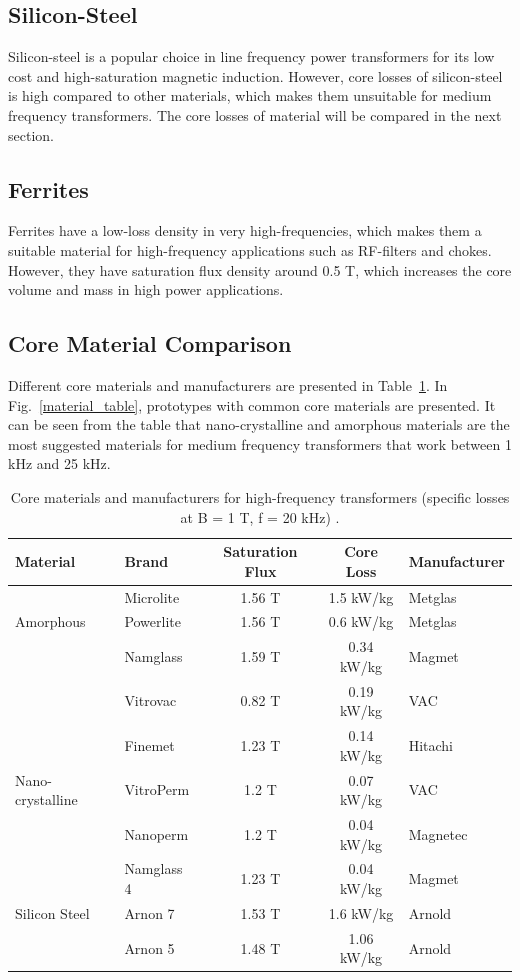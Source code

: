 \documentclass[a4paper, 11pt]{article} %
\begin{document}
\subsection*{Silicon-Steel}

Silicon-steel is a popular choice in line frequency power transformers for its low cost and high-saturation magnetic induction. However, core losses of silicon-steel is high compared to other materials, which makes them unsuitable for medium frequency transformers. The core losses of material will be compared in the next section.

\subsection*{Ferrites}

Ferrites have a low-loss density in very high-frequencies, which makes them a suitable material for high-frequency applications such as RF-filters and chokes. However, they have saturation flux density around 0.5 T, which increases the core volume and mass in high power applications. 

\subsection*{Core Material Comparison}

Different core materials and manufacturers are presented in Table~\ref{core-loss-table}. In Fig.~\ref{material_table}, prototypes with common core materials are presented. It can be seen from the table that nano-crystalline and amorphous materials are the most suggested materials for medium frequency transformers that work between 1 kHz and 25 kHz.

\begin{table}[]
\begin{center}
\begin{tabular}{llccl}
 Material & Brand & Saturation Flux & Core Loss & Manufacturer \\ 
 \hline
& Microlite & 1.56 T & 1.5 kW/kg & Metglas\\
Amorphous & Powerlite & 1.56 T & 0.6 kW/kg & Metglas\\
& Namglass & 1.59 T & 0.34 kW/kg & Magmet\\
& Vitrovac & 0.82 T & 0.19 kW/kg & VAC\\
\hline
& Finemet & 1.23 T & 0.14 kW/kg & Hitachi\\
Nano-crystalline& VitroPerm & 1.2 T & 0.07 kW/kg & VAC\\
& Nanoperm & 1.2 T & 0.04 kW/kg & Magnetec\\
& Namglass 4 & 1.23 T & 0.04 kW/kg & Magmet\\
\hline
Silicon Steel & Arnon 7 & 1.53 T & 1.6 kW/kg & Arnold\\
& Arnon 5 & 1.48 T & 1.06 kW/kg & Arnold\\
\hline
\end{tabular} 
\end{center}
\caption{Core materials and manufacturers for high-frequency transformers (specific losses at B = 1 T, f = 20 kHz) \cite{Ortiz2010}.}
\label{core-loss-table}
\end{table}
\end{document}
